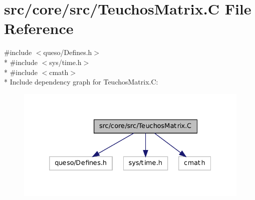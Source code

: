 \hypertarget{_teuchos_matrix_8_c}{\section{src/core/src/\-Teuchos\-Matrix.C File Reference}
\label{_teuchos_matrix_8_c}
}
{\ttfamily \#include $<$queso/\-Defines.\-h$>$}\\*
{\ttfamily \#include $<$sys/time.\-h$>$}\\*
{\ttfamily \#include $<$cmath$>$}\\*
Include dependency graph for Teuchos\-Matrix.\-C\-:
\nopagebreak
\begin{figure}[H]
\begin{center}
\leavevmode
\includegraphics[width=332pt]{_teuchos_matrix_8_c__incl}
\end{center}
\end{figure}
